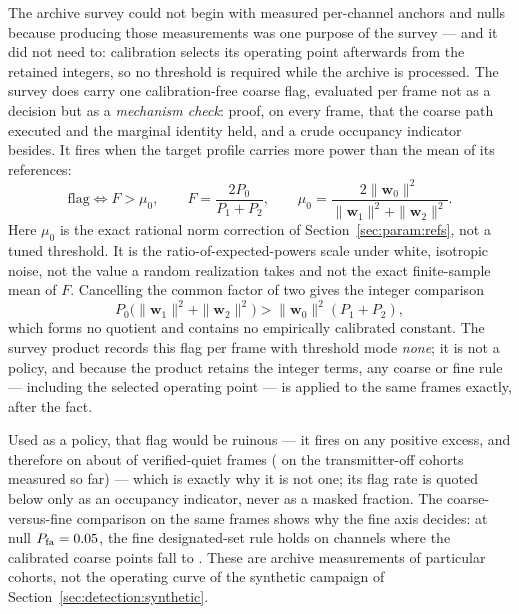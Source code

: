 The archive survey could not begin with measured per-channel anchors and nulls because producing those measurements was one purpose of the survey --- and it did not need to: calibration selects its operating point afterwards from the retained integers, so no threshold is required while the archive is processed. The survey does carry one calibration-free coarse flag, evaluated per frame not as a decision but as a \emph{mechanism check}: proof, on every frame, that the coarse path executed and the marginal identity held, and a crude occupancy indicator besides. It fires when the target profile carries more power than the mean of its references:
\begin{equation}
\label{eq:survey-bootstrap-rule}
\text{flag} \iff F > \mu_0,
\qquad
F = \frac{2 P_0}{P_1 + P_2},
\qquad
\mu_0 = \frac{2\|\mathbf{w}_0\|^2}{\|\mathbf{w}_1\|^2 + \|\mathbf{w}_2\|^2}.
\end{equation}
Here $\mu_0$ is the exact rational norm correction of Section~\ref{sec:param:refs}, not a tuned threshold. It is the ratio-of-expected-powers scale under white, isotropic noise, not the value a random realization takes and not the exact finite-sample mean of $F$. Cancelling the common factor of two gives the integer comparison
\begin{equation}
P_0\bigl(\|\mathbf{w}_1\|^2 + \|\mathbf{w}_2\|^2\bigr)
>
\|\mathbf{w}_0\|^2(P_1 + P_2),
\end{equation}
which forms no quotient and contains no empirically calibrated constant. The survey product records this flag per frame with threshold mode \emph{none}; it is not a policy, and because the product retains the integer terms, any coarse or fine rule --- including the selected operating point --- is applied to the same frames exactly, after the fact.

Used as a policy, that flag would be ruinous --- it fires on any positive excess, and therefore on about  of verified-quiet frames ( on the transmitter-off cohorts measured so far) --- which is exactly why it is not one; its flag rate is quoted below only as an occupancy indicator, never as a masked fraction. The coarse-versus-fine comparison on the same frames shows why the fine axis decides: at null $P_{\rm fa}=0.05$, the fine designated-set rule holds  on channels where the calibrated coarse points fall to . These are archive measurements of particular cohorts, not the operating curve of the synthetic campaign of Section~\ref{sec:detection:synthetic}.

